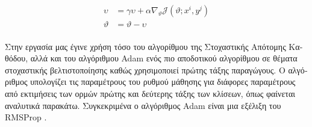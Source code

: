 \begin{equation}   
 \label{eqn:sgd_eq_momentum}
 \begin{split}
     \upsilon &= \gamma \upsilon + \alpha \nabla_{\vartheta}\mathit{\mathcal{J}(\vartheta;x^{i},y^{j})}\\
     \vartheta &= \vartheta - \upsilon
 \end{split}
\end{equation}\\

\textgreek{Στην εργασία μας έγινε χρήση τόσο του αλγορίθμου της Στοχαστικής Απότομης Καθόδου, αλλά και του αλγόριθμου} Adam \cite{adam} \textgreek{ενός πιο αποδοτικού αλγορίθμου σε θέματα στοχαστικής βελτιστοποίησης καθώς χρησιμοποιεί πρώτης τάξης παραγώγους. Ο αλγόριθμος υπολογίζει τις παραμέτρους του ρυθμού μάθησης για διάφορες παραμέτρους από εκτιμήσεις των ορμών πρώτης και δεύτερης τάξης των κλίσεων, όπως φαίνεται αναλυτικά παρακάτω. }\textgreek{Συγκεκριμένα ο αλγόριθμος }Adam \textgreek{είναι μια εξέλιξη του} RMSProp \cite{rmsProp, DBLP:journals/corr/Ruder16}. 

